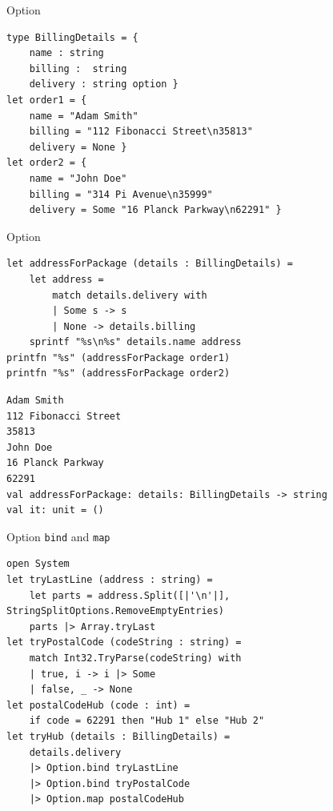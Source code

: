 \documentclass[t]{beamer}
\begin{document}
\begin{frame}[label={sec:org1f6d370},fragile]{Option}
 \begin{verbatim}
type BillingDetails = { 
    name : string
    billing :  string
    delivery : string option }
let order1 = {
    name = "Adam Smith"
    billing = "112 Fibonacci Street\n35813" 
    delivery = None }
let order2 = {
    name = "John Doe"
    billing = "314 Pi Avenue\n35999"
    delivery = Some "16 Planck Parkway\n62291" }
\end{verbatim}
\end{frame}

\begin{frame}[label={sec:org83b8d45},fragile]{Option}
 \begin{verbatim}
let addressForPackage (details : BillingDetails) = 
    let address =
        match details.delivery with 
        | Some s -> s
        | None -> details.billing
    sprintf "%s\n%s" details.name address
printfn "%s" (addressForPackage order1)
printfn "%s" (addressForPackage order2)
\end{verbatim}

\begin{verbatim}
Adam Smith
112 Fibonacci Street
35813
John Doe
16 Planck Parkway
62291
val addressForPackage: details: BillingDetails -> string
val it: unit = ()
\end{verbatim}
\end{frame}

\begin{frame}[label={sec:org6757350},fragile]{Option \texttt{bind} and \texttt{map}}
 \begin{verbatim}
open System
let tryLastLine (address : string) = 
    let parts = address.Split([|'\n'|], StringSplitOptions.RemoveEmptyEntries)
    parts |> Array.tryLast
let tryPostalCode (codeString : string) = 
    match Int32.TryParse(codeString) with 
    | true, i -> i |> Some
    | false, _ -> None
let postalCodeHub (code : int) = 
    if code = 62291 then "Hub 1" else "Hub 2"
let tryHub (details : BillingDetails) = 
    details.delivery
    |> Option.bind tryLastLine 
    |> Option.bind tryPostalCode 
    |> Option.map postalCodeHub
\end{verbatim}
\end{frame}
\end{document}
